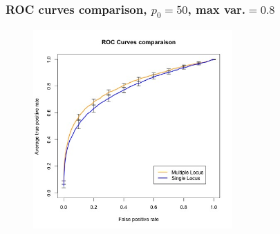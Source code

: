 \documentclass{beamer}
\begin{document}
\begin{frame}
\frametitle{ROC curves comparison, $p_0 = 50$, max var.$=0.8$}
\begin{figure}
\includegraphics[width=3in]{images/ROC_Comp_p0_50_var_0_8.jpeg}
\end{figure}
\end{frame}
\end{document}

